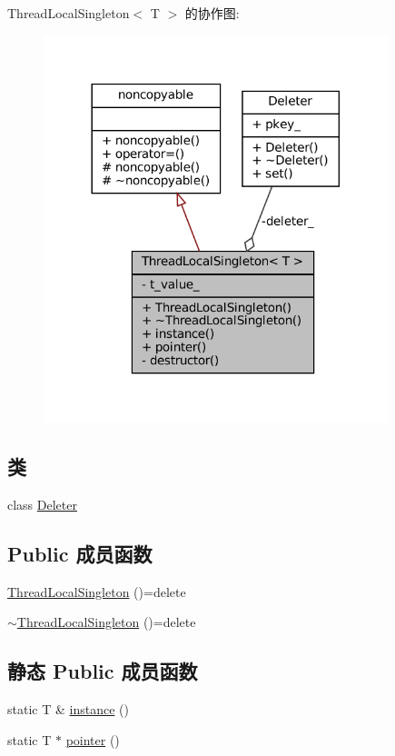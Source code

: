 Thread\+Local\+Singleton$<$ T $>$ 的协作图\+:
\nopagebreak
\begin{figure}[H]
\begin{center}
\leavevmode
\includegraphics[width=284pt]{classmuduo_1_1ThreadLocalSingleton__coll__graph}
\end{center}
\end{figure}
\subsection*{类}
\begin{DoxyCompactItemize}
\item 
class \hyperlink{classmuduo_1_1ThreadLocalSingleton_1_1Deleter}{Deleter}
\end{DoxyCompactItemize}
\subsection*{Public 成员函数}
\begin{DoxyCompactItemize}
\item 
\hyperlink{classmuduo_1_1ThreadLocalSingleton_a8090f00ced92dc29461f36b2c0815851}{Thread\+Local\+Singleton} ()=delete
\item 
\hyperlink{classmuduo_1_1ThreadLocalSingleton_ad48725aa63dd7133615265e129521911}{$\sim$\+Thread\+Local\+Singleton} ()=delete
\end{DoxyCompactItemize}
\subsection*{静态 Public 成员函数}
\begin{DoxyCompactItemize}
\item 
static T \& \hyperlink{classmuduo_1_1ThreadLocalSingleton_a359703743cd890f1e3df60b6b06a5724}{instance} ()
\item 
static T $\ast$ \hyperlink{classmuduo_1_1ThreadLocalSingleton_aab6f1d4429cd39922b611fbc820bcb7b}{pointer} ()
\end{DoxyCompactItemize}
